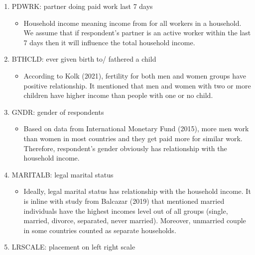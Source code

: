 \documentclass[
]{article}
\providecommand{\tightlist}{%
  \setlength{\itemsep}{0pt}\setlength{\parskip}{0pt}}
\begin{document}
\begin{enumerate}
\def\labelenumi{\arabic{enumi}.}
\tightlist
\item
  PDWRK: partner doing paid work last 7 days

  \begin{itemize}
  \tightlist
  \item
    Household income meaning income from for all workers in a household.
    We assume that if respondent's partner is an active worker within
    the last 7 days then it will influence the total household income.
  \end{itemize}
\item
  BTHCLD: ever given birth to/ fathered a child

  \begin{itemize}
  \tightlist
  \item
    According to Kolk (2021), fertility for both men and women groups
    have positive relationship. It mentioned that men and women with two
    or more children have higher income than people with one or no
    child.
  \end{itemize}
\item
  GNDR: gender of respondents

  \begin{itemize}
  \tightlist
  \item
    Based on data from International Monetary Fund (2015), more men work
    than women in most countries and they get paid more for similar
    work. Therefore, respondent's gender obviously has relationship with
    the household income.
  \end{itemize}
\item
  MARITALB: legal marital status

  \begin{itemize}
  \tightlist
  \item
    Ideally, legal marital status has relationship with the household
    income. It is inline with study from Balcazar (2019) that mentioned
    married individuals have the highest incomes level out of all groups
    (single, married, divorce, separated, never married). Moreover,
    unmarried couple in some countries counted as separate households.
  \end{itemize}
\item
  LRSCALE: placement on left right scale


\end{enumerate}
\end{document}
